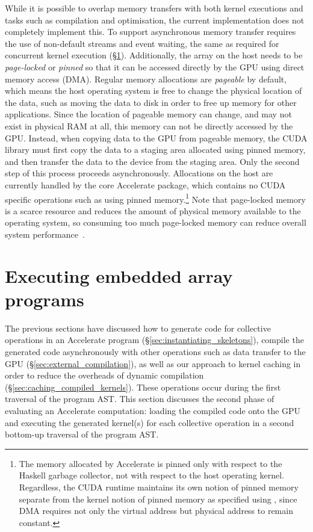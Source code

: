 While it is possible to overlap memory transfers with both kernel executions and
tasks such as compilation and optimisation, the current implementation does not
completely implement this. To support asynchronous memory transfer requires the
use of non-default streams and event waiting, the same as required for
concurrent kernel execution (\S\ref{sec:executing_programs}).
Additionally, the array on the host needs
to be \emph{page-locked} or \emph{pinned} so that it can be accessed directly by
the GPU using direct memory access (DMA). Regular memory allocations are
\emph{pageable} by default, which means the host operating system is free to
change the physical location of the data, such as moving the data to disk in
order to free up memory for other applications. Since the location of pageable
memory can change, and may not exist in physical RAM at all, this memory can not
be directly accessed by the GPU\@. Instead, when copying data to the GPU from
pageable memory, the CUDA library must first copy the data to a staging area
allocated using pinned memory, and then transfer the data to the device from the
staging area. Only the second step of this process proceeds asynchronously.
Allocations on the host are currently handled by the core Accelerate package,
which contains no CUDA specific operations such as using pinned
memory.\footnote{The memory allocated by Accelerate is pinned only with respect
to the Haskell garbage collector, not with respect to the host operating kernel.
Regardless, the CUDA runtime maintains its own notion of pinned memory
separate from the kernel notion of pinned memory as specified using
, since DMA requires not only the virtual address but physical
address to remain constant.} Note that page-locked memory is a scarce resource
and reduces the amount of physical memory available to the operating system, so
consuming too much page-locked memory can reduce overall system
performance~\cite{NVIDIA:2012wf}.


\section{Executing embedded array programs}
\label{sec:executing_programs}

The previous sections have discussed how to generate code for collective
operations in an Accelerate program (\S\ref{sec:instantiating_skeletons}),
compile the generated code asynchronously with other operations such as data
transfer to the GPU (\S\ref{sec:external_compilation}), as well as our approach
to kernel caching in order to reduce the overheads of dynamic compilation
(\S\ref{sec:caching_compiled_kernels}). These operations occur during the first
traversal of the program AST\@. This section discusses the second phase of
evaluating an Accelerate computation: loading the compiled code onto the GPU and
executing the generated kernel(s) for each collective operation in a second
bottom-up traversal of the program AST\@.


